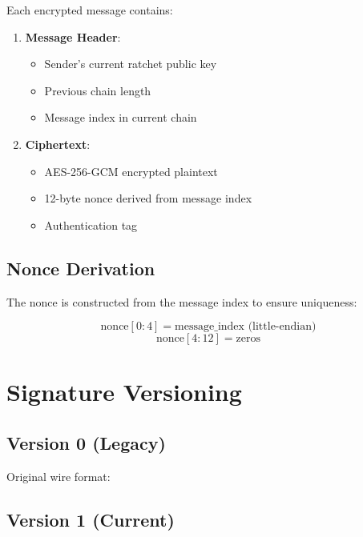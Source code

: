 \documentclass[12pt,a4paper]{article}
\begin{document}
Each encrypted message contains:

\begin{enumerate}
    \item \textbf{Message Header}:
    \begin{itemize}
        \item Sender's current ratchet public key
        \item Previous chain length
        \item Message index in current chain
    \end{itemize}
    \item \textbf{Ciphertext}:
    \begin{itemize}
        \item AES-256-GCM encrypted plaintext
        \item 12-byte nonce derived from message index
        \item Authentication tag
    \end{itemize}
\end{enumerate}

\subsection{Nonce Derivation}

The nonce is constructed from the message index to ensure uniqueness:

\begin{equation}
\text{nonce}[0:4] = \text{message\_index} \text{ (little-endian)}
\end{equation}
\begin{equation}
\text{nonce}[4:12] = \text{zeros}
\end{equation}

\section{Signature Versioning}

\subsection{Version 0 (Legacy)}

Original wire format:
\begin{equation}
[\text{4-byte Ed25519 sig length}][\text{Ed25519 sig}][\text{ML-DSA sig}]
\end{equation}

\subsection{Version 1 (Current)}
\end{document}
